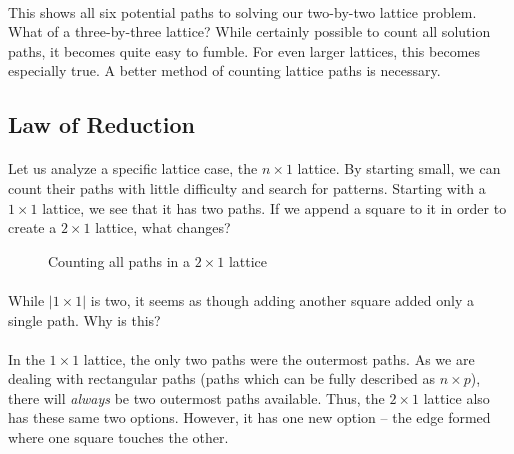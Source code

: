 \documentclass[12pt]{article}
\newcommand{\p}{\paragraph{}}
\begin{document}
			\p This shows all six potential paths to solving our two-by-two lattice problem. What of a three-by-three lattice? While certainly possible to count all solution paths, it becomes quite easy to fumble. For even larger lattices, this becomes especially true. A better method of counting lattice paths is necessary.
			
		\subsection{Law of Reduction}
		
			\p Let us analyze a specific lattice case, the $n\times1$ lattice. By starting small, we can count their paths with little difficulty and search for patterns. Starting with a $1\times1$ lattice, we see that it has two paths. If we append a square to it in order to create a $2\times1$ lattice, what changes?
			
			\begin{figure}[h]
				\centering
				
				\begin{subfigure}{.3\textwidth}
					\centering
				\end{subfigure}%
				\begin{subfigure}{.3\textwidth}
					\centering
				\end{subfigure}%
				\begin{subfigure}{.3\textwidth}
					\centering
				\end{subfigure}
			
				\caption{Counting all paths in a $2\times1$ lattice}
			\end{figure}
		
			\p While $|1\times1|$ is two, it seems as though adding another square added only a single path. Why is this?
			
			\p In the $1\times1$ lattice, the only two paths were the outermost paths. As we are dealing with rectangular paths (paths which can be fully described as $n\times p$), there will \emph{always} be two outermost paths available. Thus, the $2\times1$ lattice also has these same two options. However, it has one new option -- the edge formed where one square touches the other.
			
\end{document}
